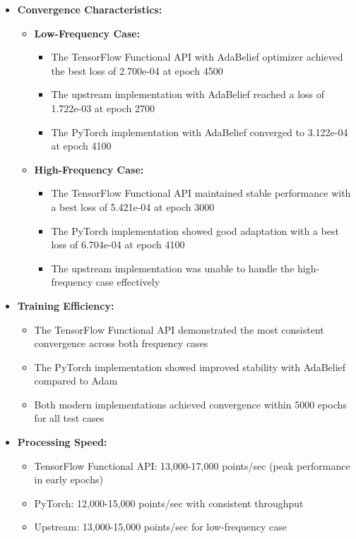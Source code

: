 \documentclass[10pt,journal,compsoc,onecolumn]{IEEEtran}
\begin{document}
\begin{itemize}
    \item \textbf{Convergence Characteristics:}
    \begin{itemize}
        \item \textbf{Low-Frequency Case:}
        \begin{itemize}
            \item The TensorFlow Functional API with AdaBelief optimizer achieved the best loss of 2.700e-04 at epoch 4500
            \item The upstream implementation with AdaBelief reached a loss of 1.722e-03 at epoch 2700
            \item The PyTorch implementation with AdaBelief converged to 3.122e-04 at epoch 4100
        \end{itemize}
        \item \textbf{High-Frequency Case:}
        \begin{itemize}
            \item The TensorFlow Functional API maintained stable performance with a best loss of 5.421e-04 at epoch 3000
            \item The PyTorch implementation showed good adaptation with a best loss of 6.704e-04 at epoch 4100
            \item The upstream implementation was unable to handle the high-frequency case effectively
        \end{itemize}
    \end{itemize}
    
    \item \textbf{Training Efficiency:}
    \begin{itemize}
        \item The TensorFlow Functional API demonstrated the most consistent convergence across both frequency cases
        \item The PyTorch implementation showed improved stability with AdaBelief compared to Adam
        \item Both modern implementations achieved convergence within 5000 epochs for all test cases
    \end{itemize}
    
    \item \textbf{Processing Speed:}
    \begin{itemize}
        \item TensorFlow Functional API: 13,000-17,000 points/sec (peak performance in early epochs)
        \item PyTorch: 12,000-15,000 points/sec with consistent throughput
        \item Upstream: 13,000-15,000 points/sec for low-frequency case
    \end{itemize}
    

\end{itemize}
\end{document}
